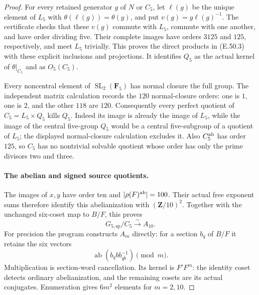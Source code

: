 \begin{proof}
For every retained generator $g$ of $N$ or $C_5$, let
$\ell(g)$ be the unique element of $L_5$ with
$\theta(\ell(g))=\theta(g)$, and put
$v(g)=g\ell(g)^{-1}$.
The certificate checks that these $v(g)$ commute with
$L_5$, commute with one another, and have order dividing
five.  Their complete images have orders $3125$ and
$125$, respectively, and meet $L_5$ trivially.
This proves the direct products in
\textup{(E.50.3)} with these explicit inclusions and
projections.  It identifies $Q_5$ as the actual kernel
of $\theta|_{C_5}$ and as $O_5(C_5)$.

Every noncentral element of $\operatorname{SL}_2(\mathbf F_5)$
has normal closure the full group.  The independent
matrix calculation records the $120$ normal-closure
orders: one is $1$, one is $2$, and the other $118$
are $120$.  Consequently every perfect quotient of
$C_5=L_5\times Q_5$ kills $Q_5$.
Indeed its image is already the image of $L_5$, while
the image of the central five-group $Q_5$ would be a
central five-subgroup of a quotient of $L_5$;
the displayed normal-closure calculation excludes it.
Also $C_5^{\rm ab}$ has order $125$, so $C_5$ has no
nontrivial solvable quotient whose order has only the
prime divisors two and three.

\paragraph{The abelian and signed source quotients.}
The images of $x,y$ have order ten and
$|\rho(F)^{\rm ab}|=100$.  Their actual free exponent
sums therefore identify this abelianization with
$(\mathbf Z/10)^2$.
Together with the unchanged six-coset map to $B/F$,
this proves
\[
                   G_{5,\mathrm{sp}}/C_5\xrightarrow{\sim}A_{10}.
 \tag{E.50.9}
\]
For precision the program constructs $A_m$ directly:
for a section $b_q$ of $B/F$ it retains the six vectors
\[
       \operatorname{ab}(b_q b b_{q\bar b}^{-1})\pmod m.
 \tag{E.50.10}
\]
Multiplication is section-word cancellation.  Its
kernel is $F'F^m$: the identity coset detects ordinary
abelianization, and the remaining cosets are its
actual conjugates.  Enumeration gives $6m^2$ elements
for $m=2,10$.


\end{proof}
